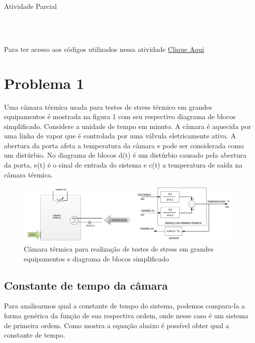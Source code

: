\documentclass[a4paper,12pt]{article}
\begin{document}
	\begin{center}
		\begin{Huge}
			Atividade Parcial
		\end{Huge}
	\end{center}

	\begin{center}
		\\
		\\
	\end{center}
	
	Para ter acesso aos códigos utilizados nessa atividade \href{https://github.com/Thgm01/ELC220-Controle-Digital/tree/main/Atividade_Parcial_01}{Clique Aqui} 
		
	
	\section{Problema 1}
	Uma câmara térmica usada para testes de stress térmico em grandes equipamentos é mostrada na figura 1 com seu respectivo diagrama de blocos simplificado. Considere a unidade de tempo em minuto. A câmara é aquecida por uma linha de vapor que é controlada por uma válvula eletricamente ativa. A abertura da porta afeta a temperatura da câmara e pode ser considerada como um distúrbio. No diagrama de blocos d(t) é um distúrbio causado pela abertura da porta, e(t) é o sinal de entrada do sistema e c(t) a temperatura de saída na câmara térmica.
	

	\begin{figure}[H]
		\centering
		\includegraphics[width=0.9\linewidth]{images/planta_problema1}
		\caption{Câmara térmica para realização de testes de stress em grandes equipamentos e diagrama de blocos simplificado}
		\label{fig:plantaproblema1}
	\end{figure}

	\subsection{Constante de tempo da câmara}
		Para analisarmos qual a constante de tempo do sistema, podemos compara-la a forma genérica da função de sua respectiva ordem, onde nesse caso é um sistema de primeira ordem. Como mostra a equação abaixo é possível obter qual a constante de tempo.
	
\end{document}
